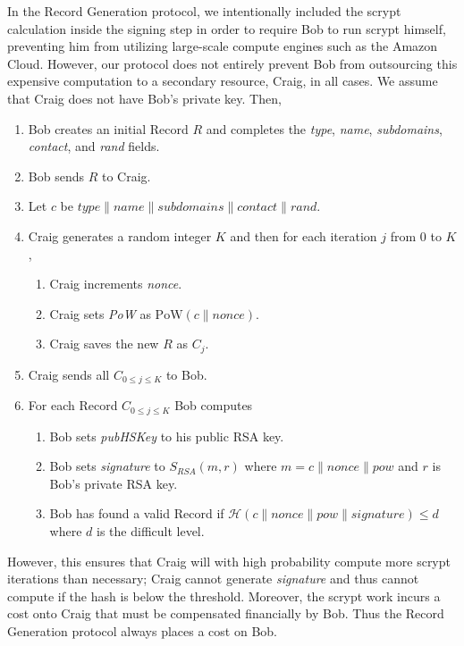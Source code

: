 \documentclass[USenglish,oneside,twocolumn]{article}
\newcommand*\concat{\mathbin{\|}}
\begin{document}
In the Record Generation protocol, we intentionally included the scrypt calculation inside the signing step in order to require Bob to run scrypt himself, preventing him from utilizing large-scale compute engines such as the Amazon Cloud. However, our protocol does not entirely prevent Bob from outsourcing this expensive computation to a secondary resource, Craig, in all cases. We assume that Craig does not have Bob's private key. Then,

\begin{enumerate}
	\item Bob creates an initial Record $ R $ and completes the \emph{type}, \emph{name}, \emph{subdomains}, \emph{contact}, and \emph{rand} fields.
	\item Bob sends $ R $ to Craig.
	\item  Let $ \mathit{c} $ be $ \mathit{type} \concat \mathit{name} \concat \mathit{subdomains} \concat \mathit{contact} \concat \mathit{rand} $.
	\item Craig generates a random integer $ K $ and then for each iteration $ j $ from 0 to $ K $,
		\begin{enumerate}
			\item Craig increments \emph{nonce}.
			\item Craig sets \emph{PoW} as $ \mathrm{PoW}(\mathit{c} \concat \mathit{nonce}) $.
			\item Craig saves the new $ R $ as $ C_{j} $.
		\end{enumerate}
	\item Craig sends all $ C_{0 \le j \le K} $ to Bob.
	\item For each Record $ C_{0 \le j \le K} $ Bob computes
		\begin{enumerate}
			\item Bob sets \emph{pubHSKey} to his public RSA key.
			\item Bob sets \emph{signature} to $ S_{\mathit{RSA}}(m, r) $ where $ m = \mathit{c} \concat \mathit{nonce} \concat \mathit{pow} $ and $ r $ is Bob's private RSA key.
			\item Bob has found a valid Record if $ \mathcal{H}(\mathit{c} \concat \mathit{nonce} \concat \mathit{pow} \concat \mathit{signature}) \leq d $ where $ d $ is the difficult level.
		\end{enumerate}
\end{enumerate}


However, this ensures that Craig will with high probability compute more scrypt iterations than necessary; Craig cannot generate \emph{signature} and thus cannot compute if the hash is below the threshold. Moreover, the scrypt work incurs a cost onto Craig that must be compensated financially by Bob. Thus the Record Generation protocol always places a cost on Bob.
\end{document}

